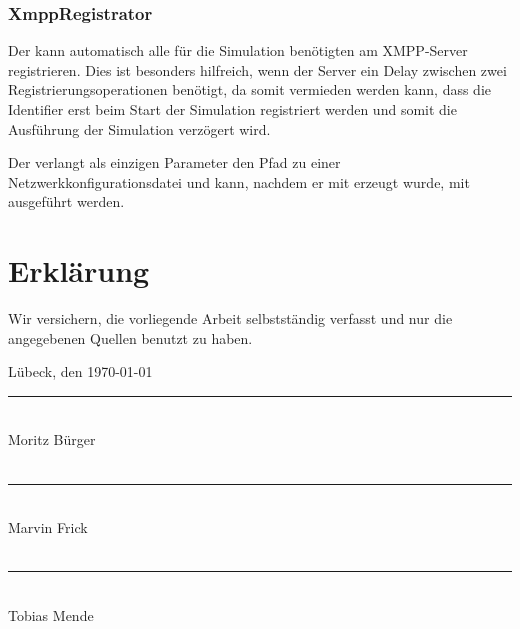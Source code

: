 \subsection{XmppRegistrator}
Der  kann automatisch alle für die Simulation benötigten  am XMPP-Server registrieren. Dies ist besonders hilfreich, wenn der Server ein Delay zwischen zwei Registrierungsoperationen benötigt, da somit vermieden werden kann, dass die Identifier erst beim Start der Simulation registriert werden und somit die Ausführung der Simulation verzögert wird.

Der  verlangt als einzigen Parameter den Pfad zu einer Netzwerkkonfigurationsdatei und kann, nachdem er mit  erzeugt wurde, mit  ausgeführt werden.

\chapter*{Erklärung}
\thispagestyle{empty}
Wir versichern, die vorliegende Arbeit selbstständig verfasst und nur die
angegebenen Quellen benutzt zu haben.


\vspace*{5cm}
Lübeck, den \today \hspace*{1cm} \rule{0.3\textwidth}{0.4pt}\\
\hspace*{17em}Moritz Bürger\\
\vspace*{2cm}\\
\hspace*{14.4em}\rule{0.3\textwidth}{0.4pt}\\
\hspace*{17em}Marvin Frick\\
\vspace*{2cm}\\
\hspace*{14.4em}\rule{0.3\textwidth}{0.4pt}\\
\hspace*{17em}Tobias Mende\\